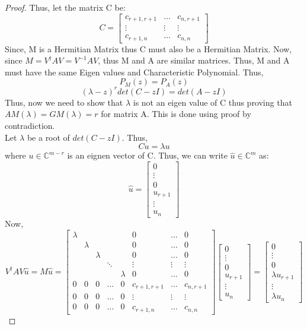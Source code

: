 \documentclass[12pt, oneside]{book}
\theoremstyle{definition}
\theoremstyle{definition}
\theoremstyle{remark}
\begin{document}
\begin{proof}
    Thus, let the matrix C be:
    \[ C=\begin{bmatrix} c_{r+1,r+1} & \ldots & c_{n,r+1} \\ \vdots & \vdots & \vdots \\ c_{r+1,n} & \ldots & c_{n,n} \end{bmatrix}\]
    Since, M is a Hermitian Matrix thus C must also be a Hermitian Matrix. 
    Now, since $M=V^{\dagger}AV=V^{-1}AV$, thus M and A are similar matrices. Thus, M and A must have the same Eigen values and Characteristic Polynomial.
    Thus, 
    \[P_M(z)=P_A(z)\]
    \[(\lambda-z)^rdet(C-zI)=det(A-zI)\]
    Thus, now we need to show that $\lambda$ is not an eigen value of C thus proving that $AM(\lambda)=GM(\lambda)=r$ for matrix A.
    This is done using proof by contradiction.\\
    Let $\lambda$ be a root of $det(C-zI)$. Thus,
    \[Cu=\lambda u\]
    where $u \in \mathbb{C}^{m-r}$ is an eignen vector of C. Thus, we can write $\hat{u} \in \mathbb{C}^m$ as:
    \[\hat{u}=\begin{bmatrix} 0 \\ \vdots \\ 0 \\ u_{r+1} \\ \vdots \\ u_n \end{bmatrix}\]
    Now,
    \[V^{\dagger}AV \hat{u}=M\hat{u}=\begin{bmatrix} \lambda & & & & & 0 & \ldots & 0 \\ & \lambda & & & & 0 & \ldots & 0 \\ & & \lambda & & & 0 & \ldots & 0 \\ & & & \ddots & & \vdots & \vdots & \vdots \\ & & & & \lambda & 0 & \ldots & 0 \\ 0 & 0 & 0 & \ldots & 0 & c_{r+1,r+1} & \ldots & c_{n,r+1} \\ 0 & 0 & 0 & \ldots & 0 & \vdots & \vdots & \vdots \\ 0 & 0 & 0 & \ldots & 0 & c_{r+1,n} & \ldots & c_{n,n} \end{bmatrix}\begin{bmatrix} 0 \\ \vdots \\ 0 \\ u_{r+1} \\ \vdots \\ u_n \end{bmatrix}=\begin{bmatrix} 0 \\ \vdots \\ 0 \\ \lambda u_{r+1} \\ \vdots \\ \lambda u_n \end{bmatrix}\]

\end{proof}
\end{document}
